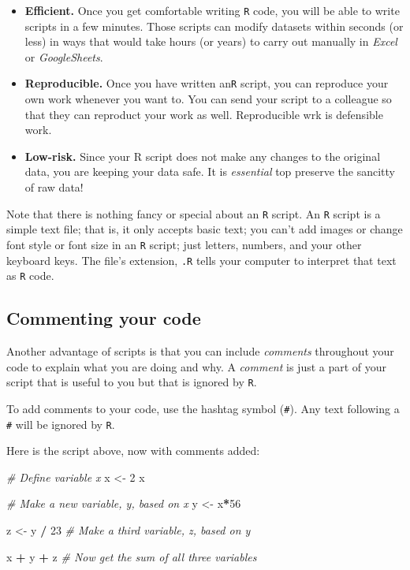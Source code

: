 \documentclass[
]{book}
\newenvironment{Shaded}{\begin{snugshade}}{\end{snugshade}}
\newcommand{\CommentTok}[1]{\textcolor[rgb]{0.56,0.35,0.01}{\textit{#1}}}
\newcommand{\DecValTok}[1]{\textcolor[rgb]{0.00,0.00,0.81}{#1}}
\newcommand{\NormalTok}[1]{#1}
\newcommand{\OperatorTok}[1]{\textcolor[rgb]{0.81,0.36,0.00}{\textbf{#1}}}
\newcommand{\StringTok}[1]{\textcolor[rgb]{0.31,0.60,0.02}{#1}}
\begin{document}
\begin{itemize}
\item
  \textbf{Efficient.} Once you get comfortable writing \texttt{R} code, you will be able to write scripts in a few minutes. Those scripts can modify datasets within seconds (or less) in ways that would take hours (or years) to carry out manually in \emph{Excel} or \emph{GoogleSheets}.
\item
  \textbf{Reproducible.} Once you have written an\texttt{R} script, you can reproduce your own work whenever you want to. You can send your script to a colleague so that they can reproduct your work as well. Reproducible wrk is defensible work.
\item
  \textbf{Low-risk.} Since your R script does not make any changes to the original data, you are keeping your data safe. It is \emph{essential} top preserve the sancitty of raw data!
\end{itemize}

Note that there is nothing fancy or special about an \texttt{R} script. An \texttt{R} script is a simple text file; that is, it only accepts basic text; you can't add images or change font style or font size in an \texttt{R} script; just letters, numbers, and your other keyboard keys. The file's extension, \texttt{.R} tells your computer to interpret that text as \texttt{R} code.

\hypertarget{commenting-your-code}{%
\subsection*{Commenting your code}\label{commenting-your-code}}

Another advantage of scripts is that you can include \emph{comments} throughout your code to explain what you are doing and why. A \emph{comment} is just a part of your script that is useful to you but that is ignored by \texttt{R}.

To add comments to your code, use the hashtag symbol (\texttt{\#}). Any text following a \texttt{\#} will be ignored by \texttt{R}.

Here is the script above, now with comments added:

\begin{Shaded}
\begin{Highlighting}[]
\CommentTok{# Define variable x}
\NormalTok{x <-}\StringTok{ }\DecValTok{2} 
\NormalTok{x}

\CommentTok{# Make a new variable, y, based on x}
\NormalTok{y <-}\StringTok{ }\NormalTok{x}\OperatorTok{*}\DecValTok{56}

\NormalTok{z <-}\StringTok{ }\NormalTok{y }\OperatorTok{/}\StringTok{ }\DecValTok{23} \CommentTok{# Make a third variable, z, based on y}
 
\NormalTok{x }\OperatorTok{+}\StringTok{ }\NormalTok{y }\OperatorTok{+}\StringTok{ }\NormalTok{z }\CommentTok{# Now get the sum of all three variables}
\end{Highlighting}
\end{Shaded}
\end{document}
